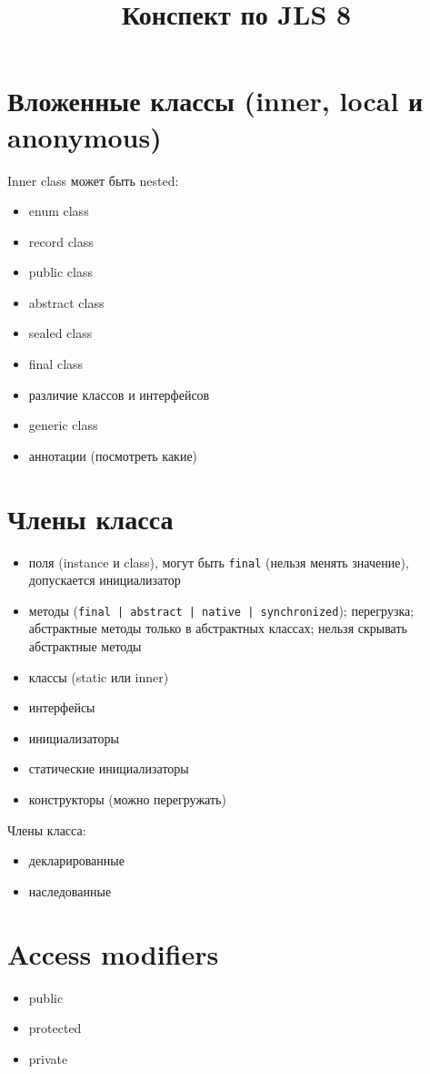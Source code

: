 \documentclass[a4paper,12pt]{article}
\title{Конспект по JLS 8}
\date{}
\begin{document}
\maketitle

\section*{Вложенные классы (inner, local и anonymous)}
Inner class может быть nested:
\begin{itemize}
  \item enum class
  \item record class
  \item public class
  \item abstract class
  \item sealed class
  \item final class
  \item различие классов и интерфейсов
  \item generic class
  \item аннотации (посмотреть какие)
\end{itemize}

\section*{Члены класса}
\begin{itemize}
  \item поля (instance и class), могут быть \texttt{final} (нельзя менять значение), допускается инициализатор
  \item методы (\texttt{final | abstract | native | synchronized}); перегрузка; абстрактные методы только в абстрактных классах; нельзя скрывать абстрактные методы
  \item классы (static или inner)
  \item интерфейсы
  \item инициализаторы
  \item статические инициализаторы
  \item конструкторы (можно перегружать)
\end{itemize}

Члены класса:
\begin{itemize}
  \item декларированные
  \item наследованные
\end{itemize}

\section*{Access modifiers}
\begin{itemize}
  \item public
  \item protected
  \item private
\end{itemize}
\end{document}
